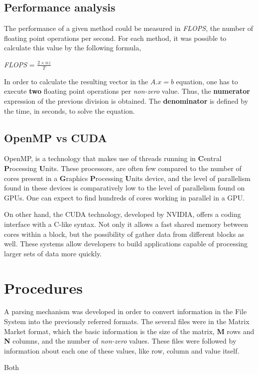 \documentclass[12pt]{article}
\begin{document}
\subsection*{Performance analysis}

\par The performance of a given method could be measured in \textit{FLOPS}, the number of floating point operations per second. For each method, it was possible to calculate this value by the following formula,

\begin{center}
\large
\textit{FLOPS} = 
\huge
$
\frac{2 \times nz}{T}
$
\end{center}

\par In order to calculate the resulting vector in the $A.x = b$ equation, one has to execute \textbf{two} floating point operations per \textit{non-zero} value. Thus, the \textbf{numerator} expression of the previous division is obtained. The \textbf{denominator} is defined by the time, in seconds, to solve the equation. 

\subsection*{OpenMP vs CUDA}
OpenMP, is a technology that makes use of threads running in \textbf{C}entral \textbf{P}rocessing \textbf{U}nits. These processors, are often few compared to the number of cores present in a \textbf{G}raphics \textbf{P}rocessing \textbf{U}nits device, and the level of parallelism found in these devices is comparatively low to the level of parallelism found on GPUs. One can expect to find hundreds of cores working in parallel in a GPU. 
\par On other hand, the CUDA technology, developed by NVIDIA, offers a coding interface with a C-like syntax. Not only it allows a fast shared memory between cores within a block, but the possibility of gather data from different blocks as well. These systems allow developers to build applications capable of processing larger sets of data more quickly.\cite{cpu-gpu} 


\section*{Procedures}
\par A parsing mechanism was developed in order to convert information in the File System into the previously referred formats. The several files were in the Matrix Market format, which the basic information is the size of the matrix, \textbf{M} rows and \textbf{N} columns, and the number of \textit{non-zero} values. These files were followed by information about each one of these values, like row, column and value itself. 
\par Both 
\end{document}
